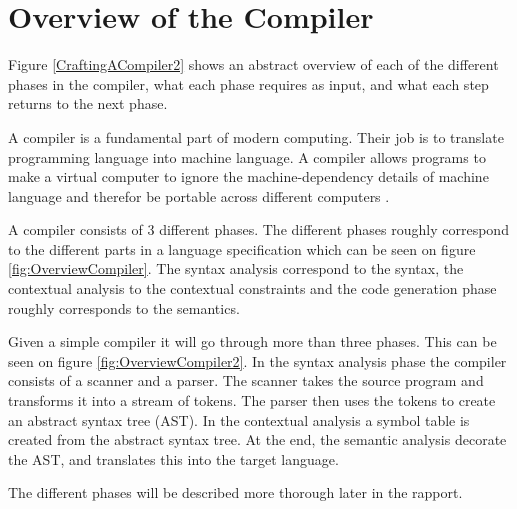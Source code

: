 \section{Overview of the Compiler}


Figure \ref{CraftingACompiler2} shows an abstract overview of each of the different phases in the compiler, what each phase requires as input, and what each step returns to the next phase.

A compiler is a fundamental part of modern computing. Their job is to translate programming language into machine language. A compiler allows programs to make a virtual computer to ignore the machine-dependency details of machine language and therefor be portable across different computers  \citep{CraftingACompiler}.



A compiler consists of 3 different phases. The different phases roughly correspond to the different parts in a language specification which can be seen on figure \ref{fig:OverviewCompiler}. The syntax analysis correspond to the syntax, the contextual analysis to the contextual constraints and the code generation phase roughly corresponds to the semantics.

Given a simple compiler it will go through more than three phases. This can be seen on figure \ref{fig:OverviewCompiler2}. In the syntax analysis phase the compiler consists of a scanner and a parser. The scanner takes the source program and transforms it into a stream of tokens. The parser then uses the tokens to create an abstract syntax tree (AST). In the contextual analysis a symbol table is created from the abstract syntax tree. At the end, the semantic analysis decorate the AST, and translates this into the target language.

The different phases will be described more thorough later in the rapport. 